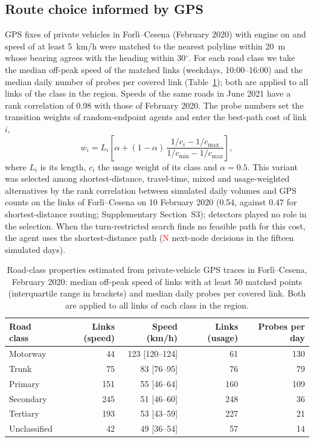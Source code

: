 \documentclass[pdflatex,Numbered]{sn-jnl}
\newcommand{\tbd}[1]{\textcolor{red}{#1}}
\begin{document}
\subsection{Route choice informed by GPS}
GPS fixes of private vehicles in Forl\`i--Cesena (February 2020) with engine on and speed of at least 5~km/h were matched to the nearest polyline within 20~m whose bearing agrees with the heading within 30$^\circ$. For each road class we take the median off-peak speed of the matched links (weekdays, 10:00--16:00) and the median daily number of probes per covered link (Table~\ref{tab:classes}); both are applied to all links of the class in the region. Speeds of the same roads in June 2021 have a rank correlation of 0.98 with those of February 2020. The probe numbers set the transition weights of random-endpoint agents and enter the best-path cost of link $i$,
\begin{equation}
w_i = L_i\left[\alpha + (1-\alpha)\,\frac{1/c_i - 1/c_{\max}}{1/c_{\min} - 1/c_{\max}}\right],
\label{eq:route_cost}
\end{equation}
where $L_i$ is its length, $c_i$ the usage weight of its class and $\alpha=0.5$. This variant was selected among shortest-distance, travel-time, mixed and usage-weighted alternatives by the rank correlation between simulated daily volumes and GPS counts on the links of Forl\`i--Cesena on 10 February 2020 (0.54, against 0.47 for shortest-distance routing; Supplementary Section~S3); detectors played no role in the selection. When the turn-restricted search finds no feasible path for this cost, the agent uses the shortest-distance path (\tbd{N} next-node decisions in the fifteen simulated days).

\begin{table}[htbp]
\centering
\caption{Road-class properties estimated from private-vehicle GPS traces in Forl\`i--Cesena, February 2020: median off-peak speed of links with at least 50 matched points (interquartile range in brackets) and median daily probes per covered link. Both are applied to all links of each class in the region.}
\label{tab:classes}
\begin{tabular}{@{}lrrrr@{}}
\toprule
Road class & Links (speed) & Speed (km/h) & Links (usage) & Probes per day \\
\midrule
Motorway & 44 & 123 [120--124] & 61 & 130 \\
Trunk & 75 & 83 [76--95] & 76 & 79 \\
Primary & 151 & 55 [46--64] & 160 & 109 \\
Secondary & 245 & 51 [46--60] & 248 & 36 \\
Tertiary & 193 & 53 [43--59] & 227 & 21 \\
Unclassified & 42 & 49 [36--54] & 57 & 14 \\
\bottomrule
\end{tabular}
\end{table}
\end{document}
